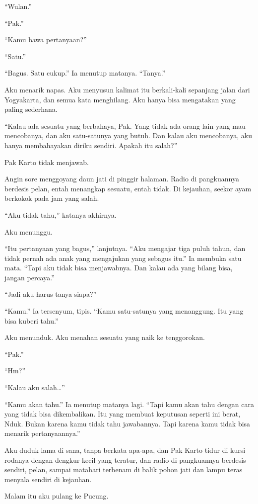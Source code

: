 \documentclass[11pt,twoside,openany]{book}
\makeatletter
\newcommand{\scenebreak}{\par\vspace{0.9em}{\centering\textsc{*\hspace{0.7em}*\hspace{0.7em}*}\par}\vspace{0.9em}\@afterindentfalse\@afterheading}
\makeatother
\begin{document}
``Wulan.''

``Pak.''

``Kamu bawa pertanyaan?''

``Satu.''

``Bagus. Satu cukup.'' Ia menutup matanya. ``Tanya.''

Aku menarik napas. Aku menyusun kalimat itu berkali-kali sepanjang jalan dari Yogyakarta, dan semua kata menghilang. Aku hanya bisa mengatakan yang paling sederhana.

``Kalau ada sesuatu yang berbahaya, Pak. Yang tidak ada orang lain yang mau mencobanya, dan aku satu-satunya yang butuh. Dan kalau aku mencobanya, aku hanya membahayakan diriku sendiri. Apakah itu salah?''

Pak Karto tidak menjawab.

Angin sore menggoyang daun jati di pinggir halaman. Radio di pangkuannya berdesis pelan, entah menangkap sesuatu, entah tidak. Di kejauhan, seekor ayam berkokok pada jam yang salah.

``Aku tidak tahu,'' katanya akhirnya.

Aku menunggu.

``Itu pertanyaan yang bagus,'' lanjutnya. ``Aku mengajar tiga puluh tahun, dan tidak pernah ada anak yang mengajukan yang sebagus itu.'' Ia membuka satu mata. ``Tapi aku tidak bisa menjawabnya. Dan kalau ada yang bilang bisa, jangan percaya.''

``Jadi aku harus tanya siapa?''

``Kamu.'' Ia tersenyum, tipis. ``Kamu satu-satunya yang menanggung. Itu yang bisa kuberi tahu.''

Aku menunduk. Aku menahan sesuatu yang naik ke tenggorokan.

``Pak.''

``Hm?''

``Kalau aku salah\ldots{}''

``Kamu akan tahu.'' Ia menutup matanya lagi. ``Tapi kamu akan tahu dengan cara yang tidak bisa dikembalikan. Itu yang membuat keputusan seperti ini berat, Nduk. Bukan karena kamu tidak tahu jawabannya. Tapi karena kamu tidak bisa menarik pertanyaannya.''

Aku duduk lama di sana, tanpa berkata apa-apa, dan Pak Karto tidur di kursi rodanya dengan dengkur kecil yang teratur, dan radio di pangkuannya berdesis sendiri, pelan, sampai matahari terbenam di balik pohon jati dan lampu teras menyala sendiri di kejauhan.

\scenebreak
Malam itu aku pulang ke Pucung.
\end{document}
